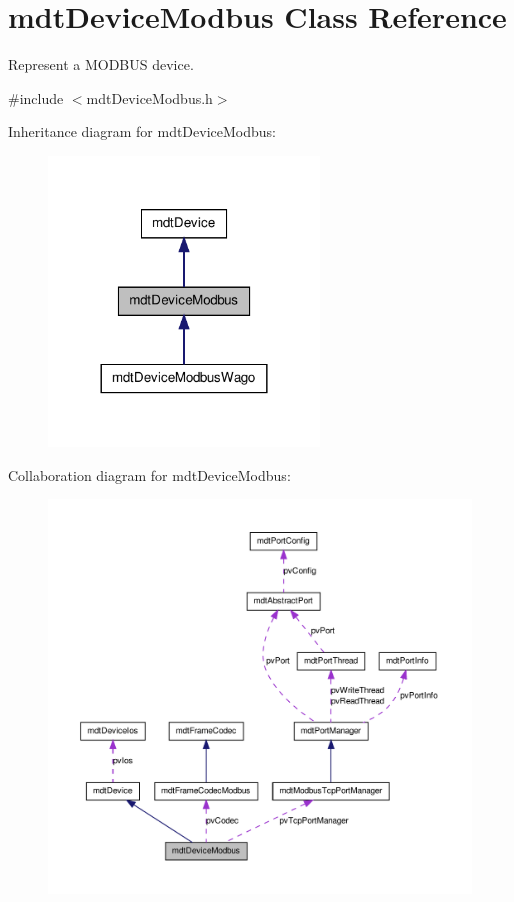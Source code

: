 \hypertarget{classmdt_device_modbus}{
\section{mdtDeviceModbus Class Reference}
\label{classmdt_device_modbus}
}


Represent a MODBUS device.  




{\ttfamily \#include $<$mdtDeviceModbus.h$>$}



Inheritance diagram for mdtDeviceModbus:\nopagebreak
\begin{figure}[H]
\begin{center}
\leavevmode
\includegraphics[width=204pt]{classmdt_device_modbus__inherit__graph}
\end{center}
\end{figure}


Collaboration diagram for mdtDeviceModbus:\nopagebreak
\begin{figure}[H]
\begin{center}
\leavevmode
\includegraphics[width=400pt]{classmdt_device_modbus__coll__graph}
\end{center}
\end{figure}
